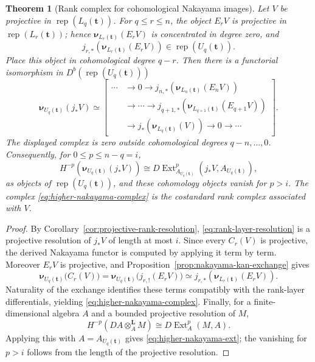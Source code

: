 \documentclass[10pt,a4paper]{amsart}
\newtheorem{theorem}{Theorem}[section]
\newcommand{\Rep}{\operatorname{rep}}
\newcommand{\Ext}{\operatorname{Ext}}
\begin{document}
\begin{theorem}[Rank complex for cohomological Nakayama images]\label{thm:higher-nakayama-rank-complex}
Let $V$ be projective in $\Rep(L_q(\mathbf t))$.  For $q\le r\le n$, the
object $E_rV$ is projective in $\Rep(L_r(\mathbf t))$; hence
$\boldsymbol\nu_{L_r(\mathbf t)}(E_rV)$ is concentrated in degree zero, and
\[
j_{r,*}\!\left(\boldsymbol\nu_{L_r(\mathbf t)}(E_rV)\right)
\in\Rep(U_q(\mathbf t)).
\]
Place this object in cohomological degree $q-r$.  Then there is a functorial
isomorphism in $D^b(\Rep(U_q(\mathbf t)))$
\begin{equation}\label{eq:higher-nakayama-complex}
\boxed{
\boldsymbol\nu_{U_q(\mathbf t)}(j_*V)
\simeq
\left[
\begin{aligned}
\cdots&\longrightarrow 0\longrightarrow
j_{n,*}\!\left(\boldsymbol\nu_{L_n(\mathbf t)}(E_nV)\right)\\
&\longrightarrow\cdots\longrightarrow
j_{q+1,*}\!\left(\boldsymbol\nu_{L_{q+1}(\mathbf t)}(E_{q+1}V)\right)\\
&\longrightarrow
j_*\!\left(\boldsymbol\nu_{L_q(\mathbf t)}(V)\right)
\longrightarrow 0\longrightarrow\cdots
\end{aligned}
\right].}
\end{equation}
The displayed complex is zero outside cohomological degrees
$q-n,\ldots,0$.  Consequently, for $0\le p\le n-q=i$,
\begin{equation}\label{eq:higher-nakayama-ext}
H^{-p}\!\left(\boldsymbol\nu_{U_q(\mathbf t)}(j_*V)\right)
\cong
D\Ext^p_{A_{U_q(\mathbf t)}}
\!\left(j_*V,A_{U_q(\mathbf t)}\right),
\end{equation}
as objects of $\Rep(U_q(\mathbf t))$, and these cohomology objects vanish for
$p>i$.  The complex
\eqref{eq:higher-nakayama-complex} is the costandard rank complex associated
with $V$.
\end{theorem}

\begin{proof}
By Corollary~\ref{cor:projective-rank-resolution},
\eqref{eq:rank-layer-resolution} is a projective resolution of $j_*V$ of
length at most $i$.  Since every $C_r(V)$ is projective, the derived Nakayama
functor is computed by applying it term by term.  Moreover $E_rV$ is
projective, and Proposition~\ref{prop:nakayama-kan-exchange} gives
\[
\boldsymbol\nu_{U_q(\mathbf t)}\bigl(C_r(V)\bigr)
=
\boldsymbol\nu_{U_q(\mathbf t)}\bigl(j_{r,!}(E_rV)\bigr)
\simeq
j_{r,*}\!\left(\boldsymbol\nu_{L_r(\mathbf t)}(E_rV)\right).
\]
Naturality of the exchange identifies these terms compatibly with the
rank-layer differentials, yielding \eqref{eq:higher-nakayama-complex}.
Finally, for a finite-dimensional algebra $A$ and a bounded projective
resolution of $M$,
\[
H^{-p}(DA\otimes_A^{\mathbf L}M)
\cong
D\Ext_A^p(M,A).
\]
Applying this with $A=A_{U_q(\mathbf t)}$ gives
\eqref{eq:higher-nakayama-ext}; the vanishing for $p>i$ follows from the
length of the projective resolution.
\end{proof}
\end{document}
